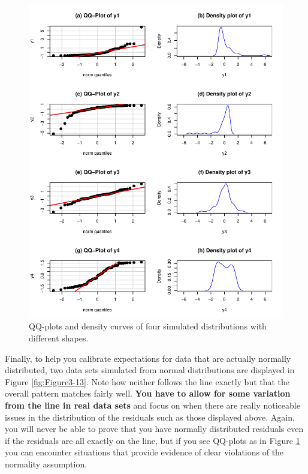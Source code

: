 \documentclass[]{book}
\theoremstyle{definition}
\theoremstyle{definition}
\theoremstyle{remark}
\begin{document}
\begin{figure}
\centering
\includegraphics{03-oneWayAnova_files/figure-latex/Figure3-12-1.pdf}
\caption{\label{fig:Figure3-12}QQ-plots and density curves of four simulated
distributions with different shapes.}
\end{figure}

Finally, to help you calibrate expectations for data that are actually
normally distributed, two data sets simulated from normal distributions
are displayed in Figure \ref{fig:Figure3-13}. Note how neither follows
the line exactly but that the overall pattern matches fairly well.
\textbf{You have to allow for some variation from the line in real data
sets} and focus on when there are really noticeable issues in the
distribution of the residuals such as those displayed above. Again, you
will never be able to prove that you have normally distributed residuals
even if the residuals are all exactly on the line, but if you see
QQ-plots as in Figure \ref{fig:Figure3-12} you can encounter situations
that provide evidence of clear violations of the normality assumption.
\end{document}
